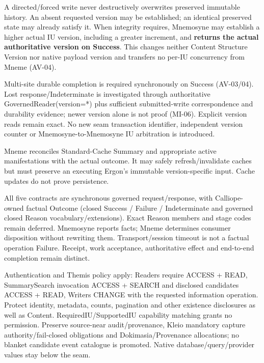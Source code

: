 A directed/forced write never destructively overwrites preserved immutable history. An absent requested version may be established; an identical preserved state may already satisfy it. When integrity requires, Mnemosyne may establish a higher actual IU version, including a greater increment, and \textbf{returns the actual authoritative version on Success}. This changes neither Content Structure Version nor native payload version and transfers no per-IU concurrency from Mneme (AV-04).



Multi-site durable completion is required synchronously on Success (AV-03/04). Lost response/Indeterminate is investigated through authoritative GovernedReader(version=*) plus sufficient submitted-write correspondence and durability evidence; newer version alone is not proof (MI-06). Explicit version reads remain exact. No new seam transaction identifier, independent version counter or Mnemosyne-to-Mnemosyne IU arbitration is introduced.



Mneme reconciles Standard-Cache Summary and appropriate active manifestations with the actual outcome. It may safely refresh/invalidate caches but must preserve an executing Ergon's immutable version-specific input. Cache updates do not prove persistence.



All five contracts are synchronous governed request/response, with Calliope-owned factual Outcome (closed Success / Failure / Indeterminate and governed closed Reason vocabulary/extensions). Exact Reason members and stage codes remain deferred. Mnemosyne reports facts; Mneme determines consumer disposition without rewriting them. Transport/session timeout is not a factual operation Failure. Receipt, work acceptance, authoritative effect and end-to-end completion remain distinct.



Authentication and Themis policy apply: Readers require ACCESS + READ, SummarySearch invocation ACCESS + SEARCH and disclosed candidates ACCESS + READ, Writers CHANGE with the requested information operation. Protect identity, metadata, counts, pagination and other existence disclosures as well as Content. RequiredIU/SupportedIU capability matching grants no permission. Preserve source-near audit/provenance, Kleio mandatory capture authority/fail-closed obligations and Dokimasia/Provenance allocations; no blanket candidate event catalogue is promoted. Native database/query/provider values stay below the seam.




